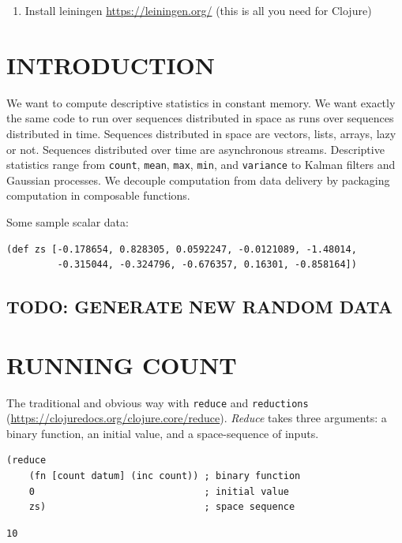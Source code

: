 \documentclass[10pt,oneside,x11names]{article}
\begin{document}
\begin{enumerate}
\item Install leiningen \url{https://leiningen.org/} (this is all you need for Clojure)
\end{enumerate}

\section{INTRODUCTION}
\label{introduction}
We want to compute descriptive statistics in constant memory. We want
exactly the same code to run over sequences distributed in space as runs
over sequences distributed in time. Sequences distributed in space are
vectors, lists, arrays, lazy or not. Sequences distributed over time are
asynchronous streams. Descriptive statistics range from \texttt{count}, \texttt{mean},
\texttt{max}, \texttt{min}, and \texttt{variance} to Kalman filters and Gaussian processes.
We decouple computation from data delivery by packaging computation in
composable functions.

Some sample scalar data:

\begin{verbatim}
(def zs [-0.178654, 0.828305, 0.0592247, -0.0121089, -1.48014,
         -0.315044, -0.324796, -0.676357, 0.16301, -0.858164])
\end{verbatim}

\subsection{TODO: GENERATE NEW RANDOM DATA}
\label{sec:org6c16aa4}

\section{RUNNING COUNT}
\label{running-count}
The traditional and obvious way with \texttt{reduce} and \texttt{reductions}
(\url{https://clojuredocs.org/clojure.core/reduce}). \emph{Reduce} takes three
arguments: a binary function, an initial value, and a space-sequence of
inputs.

\begin{verbatim}
(reduce
    (fn [count datum] (inc count)) ; binary function
    0                              ; initial value
    zs)                            ; space sequence
\end{verbatim}

\begin{verbatim}
10
\end{verbatim}
\end{document}
